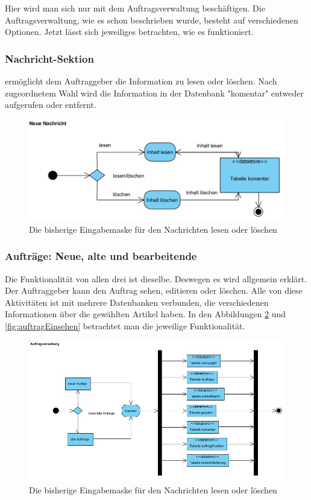 Hier wird man sich nur mit dem Auftragsverwaltung beschäftigen. Die Auftragsverwaltung, wie es schon beschrieben wurde, besteht auf verschiedenen Optionen. Jetzt lässt sich jeweiliges betrachten, wie es funktioniert. 
	
\subsubsection{Nachricht-Sektion} ermöglicht dem Auftraggeber die Information zu lesen oder löschen. Nach zugeordnetem Wahl wird die Information in der Datenbank "komentar" entweder aufgerufen oder entfernt. 

\begin{figure}[h]
	\centering
	\includegraphics[width=0.8\linewidth]{Graphics/NeueNachricht.JPG}
	\caption[Kommunikation]{Die bisherige Eingabemaske für den Nachrichten lesen oder löschen}
	\label{fig:Kommunikation}
\end{figure}



\subsubsection{Aufträge: Neue, alte und bearbeitende}

Die Funktionalität von allen drei ist dieselbe. Deswegen es wird allgemein erklärt. Der Auftraggeber kann den Auftrag sehen, editieren oder löschen. Alle von diese Aktivitäten ist mit mehrere Datenbanken verbunden, die verschiedenen Informationen über die gewählten Artikel haben. In den Abbildungen \ref{fig:Autrag_Loeschen} und \ref{fig:auftragEinsehen} betrachtet man die jeweilige Funktionalität.


\begin{figure}[h]
	\centering
	\includegraphics[width=1\linewidth]{Graphics/Autrag_Loeschen.JPG}
	\caption[AutragLoeschen]{Die bisherige Eingabemaske für den Nachrichten lesen oder löschen}
	\label{fig:Autrag_Loeschen}
\end{figure}
 
